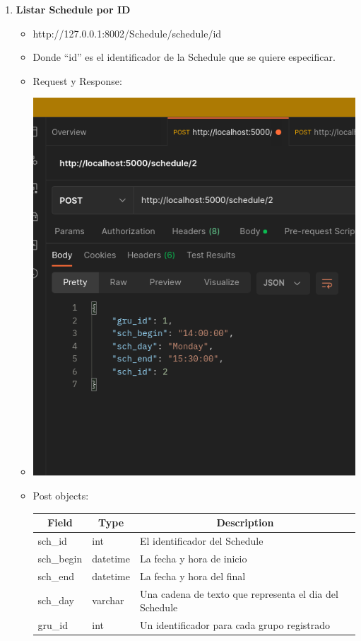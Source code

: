 \documentclass{article}
\begin{document}
\begin{enumerate}
    \item \textbf{Listar Schedule por ID}
    \begin{itemize}
        \item http://127.0.0.1:8002/Schedule/schedule/id
        \item Donde ``id'' es el identificador de la Schedule que se
        quiere especificar.
        \item Request y Response:
        \item \includegraphics[scale=.5]{assets/schedule/schedule2.png}
        \item Post objects:
        \begin{table}[H] \centering \begin{tabular}{|l|l|l|} \hline
        \multicolumn{1}{|c|}{\textbf{Field}} &
        \multicolumn{1}{c|}{\textbf{Type}} &
        \multicolumn{1}{c|}{\textbf{Description}} \\ \hline sch\_id & int & El
        identificador del Schedule \\ \hline sch\_begin & datetime & La fecha y
        hora de inicio \\ \hline sch\_end & datetime & La fecha y hora del final
        \\ \hline sch\_day & varchar & Una cadena de texto que representa el dia
        del Schedule \\ \hline gru\_id & int & Un identificador para cada grupo
        registrado \\ \hline \end{tabular} \end{table}
        

\end{itemize}
\end{enumerate}
\end{document}
